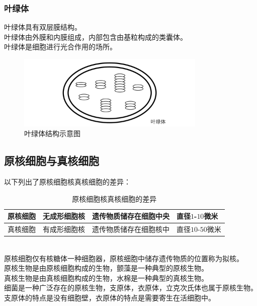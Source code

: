 \documentclass[UTF8]{ctexart}
\begin{document}
\subsubsection{叶绿体}
    叶绿体具有双层膜结构。\\[3mm]
    叶绿体由外膜和内膜组成，内部包含由基粒构成的类囊体。\\[3mm]
    叶绿体是细胞进行光合作用的场所。
    \begin{figure}[h]
        \begin{center}
            \includegraphics[width=9cm]{BiologyImage/8.jpg}
            \caption{叶绿体结构示意图}
        \end{center}
    \end{figure}

\newpage

\subsection{原核细胞与真核细胞}
    以下列出了原核细胞核真核细胞的差异：\vspace{5pt}
    \begin{table}[h]
        \begin{center}
            \begin{tabular}{l|l|l|l}
                \hline
                原核细胞\qquad&无成形细胞核\qquad&遗传物质储存在细胞中央\qquad&直径$1$-$10$微米\qquad\\ \hline
                真核细胞\qquad&有成形细胞核\qquad&遗传物质储存在细胞核中\qquad&直径$10$-$50$微米\qquad\\ \hline
            \end{tabular}
            \caption{原核细胞核真核细胞的差异}
        \end{center}
    \end{table}\\
    原核细胞仅有核糖体一种细胞器，原核细胞中储存遗传物质的位置称为拟核。\\[3mm]
    原核生物是由原核细胞构成的生物，颤藻是一种典型的原核生物。\\[3mm]
    真核生物是由真核细胞构成的生物，水棉是一种典型的真核生物。\\[6mm]
    细菌是一种广泛存在的原核生物，支原体，衣原体，立克次氏体也属于原核生物。\\[3mm]
    支原体的特点是没有细胞壁，衣原体的特点是需要寄生在活细胞中。\\
\end{document}
